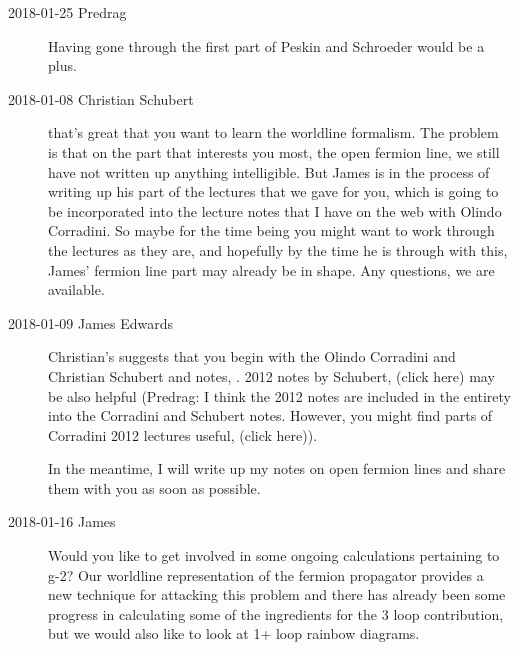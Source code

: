 \begin{description}

\item[2018-01-25  Predrag] %
Having gone through the first part of Peskin and Schroeder
would be a plus.

\item[2018-01-08 Christian Schubert]
that's great that you want to learn the worldline formalism. The problem
is that on the part that interests you most, the open fermion line, we
still have not written up anything intelligible. But James is in
the process of writing up his part of the lectures that we gave for you,
which is going to be incorporated into the lecture notes that I have on
the web with Olindo Corradini. So maybe for the time being you might
want to work through the lectures as they are, and hopefully by the time
he is through with this, James' fermion line part may already be in shape.
Any questions, we are available.

\item[2018-01-09 James Edwards ]
Christian's suggests that you begin with the Olindo Corradini
and Christian Schubert and
 notes, . 2012 notes by
Schubert,
{(click here)} may be also helpful
(Predrag: I think the 2012 notes are included in the entirety into the
Corradini and Schubert  notes. However, you might find parts of
Corradini 2012 lectures useful,
{(click here)}).

In the meantime, I will write up my notes on open fermion lines and share
them with you as soon as possible.

\item[2018-01-16 James]
Would you like to get involved in some ongoing calculations pertaining
to g-2? Our worldline representation of the fermion propagator provides a
new technique for attacking this problem and there has already been some
progress in calculating some of the ingredients for the 3 loop
contribution, but we would also like to look at 1+ loop rainbow diagrams.


\end{description}
